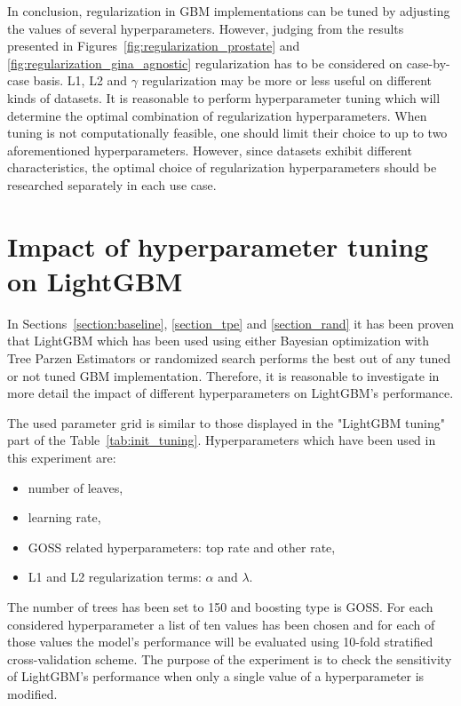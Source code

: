 \documentclass[magisterska, english]{pwr_wmat_praca_dyplomowa}
\theoremstyle{plain}
\numberwithin{theorem}{chapter}
\theoremstyle{definition}
\numberwithin{theorem}{chapter}
\begin{document}
In conclusion, regularization in GBM implementations can be tuned by adjusting the values of several hyperparameters. However, judging from the results presented in Figures~\ref{fig:regularization_prostate} and \ref{fig:regularization_gina_agnostic} regularization has to be considered on case-by-case basis. L1, L2 and $\gamma$ regularization may be more or less useful on different kinds of datasets. It is reasonable to perform hyperparameter tuning which will determine the optimal combination of regularization hyperparameters. When tuning is not computationally feasible, one should limit their choice to up to two aforementioned hyperparameters. However, since datasets exhibit different characteristics, the optimal choice of regularization hyperparameters should be researched separately in each use case.

\section{Impact of hyperparameter tuning on LightGBM}\label{section:lightgbm_tuning}
In Sections~\ref{section:baseline}, \ref{section_tpe} and \ref{section_rand} it has been proven that LightGBM which has been used using either Bayesian optimization with Tree Parzen Estimators or randomized search performs the best out of any tuned or not tuned GBM implementation. Therefore, it is reasonable to investigate in more detail the impact of different hyperparameters on LightGBM's performance.

The used parameter grid is similar to those displayed in the "LightGBM tuning" part of the Table~\ref{tab:init_tuning}. Hyperparameters which have been used in this experiment are:

\begin{itemize}
    \item number of leaves,
    \item learning rate,
    \item GOSS related hyperparameters: top rate and other rate,
    \item L1 and L2 regularization terms: $\alpha$ and $\lambda$.
\end{itemize}


The number of trees has been set to 150 and boosting type is GOSS. For each considered hyperparameter a list of ten values has been chosen and for each of those values the model's performance will be evaluated using 10-fold stratified cross-validation scheme. The purpose of the experiment is to check the sensitivity of LightGBM's performance when only a single value of a hyperparameter is modified.
\end{document}
